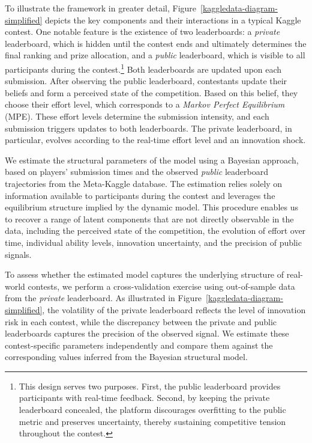 \documentclass[mnsc]{informs3}
\begin{document}
To illustrate the framework in greater detail, Figure~\ref{kaggledata-diagram-simplified} depicts the key components and their interactions in a typical Kaggle contest.
One notable feature is the existence of two leaderboards: a \textit{private} leaderboard, which is hidden until the contest ends and ultimately determines the final ranking and prize allocation, and a \textit{public} leaderboard, which is visible to all participants during the contest.\footnote{
This design serves two purposes. 
First, the public leaderboard provides participants with real-time feedback. 
Second, by keeping the private leaderboard concealed, the platform discourages overfitting to the public metric and preserves uncertainty, thereby sustaining competitive tension throughout the contest.
}
Both leaderboards are updated upon each submission.
After observing the public leaderboard, contestants update their beliefs and form a perceived state of the competition.
Based on this belief, they choose their effort level, which corresponds to a \textit{Markov Perfect Equilibrium} (MPE).
These effort levels determine the submission intensity, and each submission triggers updates to both leaderboards.
The private leaderboard, in particular, evolves according to the real-time effort level and an innovation shock.


We estimate the structural parameters of the model using a Bayesian approach, based on players’ submission times and the observed \textit{public} leaderboard trajectories from the Meta-Kaggle database.
The estimation relies solely on information available to participants during the contest and leverages the equilibrium structure implied by the dynamic model.
This procedure enables us to recover a range of latent components that are not directly observable in the data, including the perceived state of the competition, the evolution of effort over time, individual ability levels, innovation uncertainty, and the precision of public signals.


To assess whether the estimated model captures the underlying structure of real-world contests, we perform a cross-validation exercise using out-of-sample data from the \textit{private} leaderboard.
As illustrated in Figure~\ref{kaggledata-diagram-simplified}, the volatility of the private leaderboard reflects the level of innovation risk in each contest, while the discrepancy between the private and public leaderboards captures the precision of the observed signal.
We estimate these contest-specific parameters independently and compare them against the corresponding values inferred from the Bayesian structural model.
\end{document}
